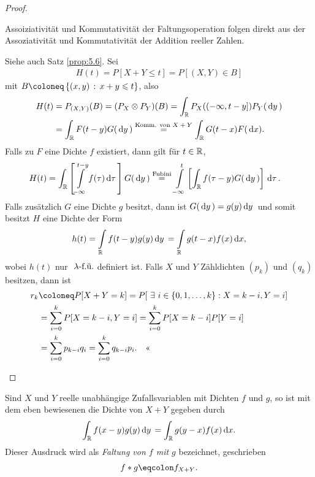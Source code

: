\begin{proof}
\begin{proofenum}
\item Assoiziativität und Kommutativität der Faltungsoperation folgen direkt aus der
Assoziativität und Kommutativität der Addition reeller
Zahlen.
\item Siehe auch Satz \ref{prop:5.6}. Sei
\begin{align*}
H(t) = P[X+Y\le t] = P[(X,Y)\in B]
\end{align*}
mit $B\defl\setdef{(x,y)}{x+y\le t}$, also
% 
% 
% 
\begin{align*}
H(t) &= P_{(X,Y)}(B) = (P_X\otimes P_Y)(B) = \int_\R
P_X((-\infty,t-y])P_Y(\dy)\\
&= \int_\R F(t-y)G(\dy) \overset{\text{Komm. von $X+Y$}}{=}  \int_\R
G(t-x)F(\dx).
\end{align*}
Falls zu $F$ eine Dichte $f$ existiert, dann gilt für $t\in\R$,
\begin{align*}
H(t) &= \int_\R \left[\int\limits_{-\infty}^{t-y}
f(\tau)\dtau\right]G(\dy) \overset{\text{Fubini}}{=}
\int\limits_{-\infty}^{t}\left[\int_\R
f(\tau-y)G(\dy)\right]\dtau.
\end{align*}
Falls zusätzlich $G$ eine Dichte $g$ besitzt, dann ist $G(\dy)=g(y)\dy$ und
somit besitzt $H$ eine Dichte der Form
\begin{align*}
h(t) = \int\limits_\R f(t-y)g(y)\dy
=
\int\limits_\R g(t-x)f(x)\dx,
\end{align*}
wobei $h(t)$ nur $\fu{\lambda}$ definiert ist. 
Falls $X$ und $Y$ Zähldichten $(p_k)$ und $(q_k)$ besitzen, dann ist
\begin{align*}
r_k &\defl P[X+Y=k] = P[\exists i\in \setd{0,1,\ldots,k}: X=k-i, Y=i]\\
&= \sum\limits_{i=0}^k P[X=k-i, Y=i]
=\sum\limits_{i=0}^k P[X=k-i]P[Y=i]\\
&=\sum\limits_{i=0}^k p_{k-i}q_i
=\sum\limits_{i=0}^k q_{k-i}p_i.\qedhere
\end{align*}
\end{proofenum}
\end{proof}

Sind $X$ und $Y$ reelle unabhängige Zufallsvariablen mit Dichten $f$ und $g$,
so ist mit dem eben bewiesenen die Dichte von $X+Y$ gegeben durch
\begin{align*}
\int_\R f(x-y)g(y)\dy = \int_\R g(y-x)f(x)\dx.  
\end{align*}
Dieser Ausdruck wird als \emph{Faltung von $f$ mit $g$} bezeichnet, geschrieben
\begin{align*}
f*g\defr f_{X+Y}.
\end{align*}

